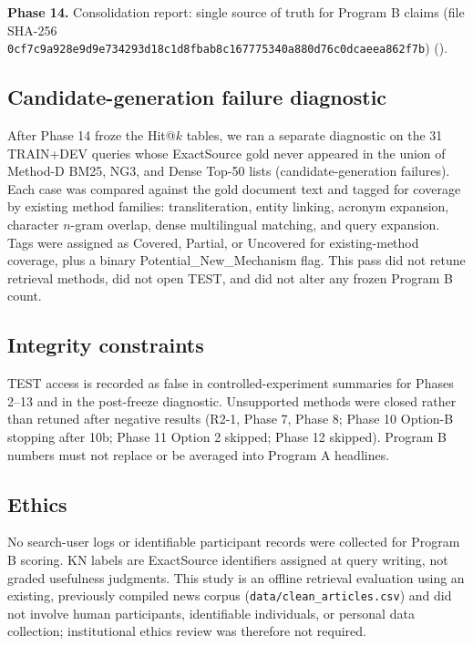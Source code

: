\documentclass[10pt,letterpaper]{article}
\begin{document}
\textbf{Phase 14.} Consolidation report: single source of truth for Program B claims (file SHA-256 \texttt{0cf7c9a928e9d9e734293d18c1d8fbab8c167775340a880d76c0dcaeea862f7b}) ().

\subsection*{Candidate-generation failure diagnostic}

After Phase 14 froze the Hit@$k$ tables, we ran a separate diagnostic on the 31 TRAIN+DEV queries whose ExactSource gold never appeared in the union of Method-D BM25, NG3, and Dense Top-50 lists (candidate-generation failures). Each case was compared against the gold document text and tagged for coverage by existing method families: transliteration, entity linking, acronym expansion, character $n$-gram overlap, dense multilingual matching, and query expansion. Tags were assigned as Covered, Partial, or Uncovered for existing-method coverage, plus a binary Potential\_New\_Mechanism flag. This pass did not retune retrieval methods, did not open TEST, and did not alter any frozen Program B count.

\subsection*{Integrity constraints}

TEST access is recorded as false in controlled-experiment summaries for Phases 2--13 and in the post-freeze diagnostic. Unsupported methods were closed rather than retuned after negative results (R2-1, Phase 7, Phase 8; Phase 10 Option-B stopping after 10b; Phase 11 Option 2 skipped; Phase 12 skipped). Program B numbers must not replace or be averaged into Program A headlines.

\subsection*{Ethics}

No search-user logs or identifiable participant records were collected for Program B scoring. KN labels are ExactSource identifiers assigned at query writing, not graded usefulness judgments. This study is an offline retrieval evaluation using an existing, previously compiled news corpus (\texttt{data/clean\_articles.csv}) and did not involve human participants, identifiable individuals, or personal data collection; institutional ethics review was therefore not required.
\end{document}
